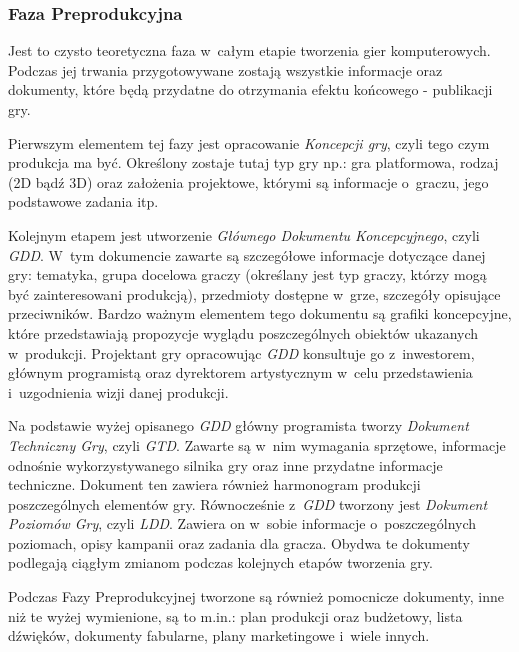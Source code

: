 \documentclass[12pt,a4paper,oneside]{book}
\theoremstyle{definition}
\numberwithin{equation}{chapter}
\begin{document}
\subsubsection{Faza Preprodukcyjna}
\par Jest to czysto teoretyczna faza w~całym etapie tworzenia gier komputerowych. Podczas jej trwania przygotowywane zostają wszystkie informacje oraz dokumenty, które będą przydatne do otrzymania efektu końcowego - publikacji gry.

\par Pierwszym elementem tej fazy jest opracowanie \textit{Koncepcji gry}, czyli tego czym produkcja ma być. Określony zostaje tutaj typ gry np.: gra platformowa, rodzaj (2D bądź 3D) oraz założenia projektowe, którymi są informacje o~graczu, jego podstawowe zadania itp.

\par Kolejnym etapem jest utworzenie \textit{Głównego Dokumentu Koncepcyjnego}, czyli \textit{GDD}. W~tym dokumencie zawarte są szczegółowe informacje dotyczące danej gry: tematyka, grupa docelowa graczy (określany jest typ graczy, którzy mogą być zainteresowani produkcją), przedmioty dostępne w~grze, szczegóły opisujące przeciwników. Bardzo ważnym elementem tego dokumentu są grafiki koncepcyjne, które przedstawiają propozycje wyglądu poszczególnych obiektów ukazanych w~produkcji. Projektant gry opracowując \textit{GDD} konsultuje go z~inwestorem, głównym programistą oraz dyrektorem artystycznym w~celu przedstawienia i~uzgodnienia wizji danej produkcji.
\par Na podstawie wyżej opisanego \textit{GDD} główny programista tworzy \textit{Dokument Techniczny Gry}, czyli \textit{GTD}. Zawarte są w~nim wymagania sprzętowe, informacje odnośnie wykorzystywanego silnika gry oraz inne przydatne informacje techniczne. Dokument ten zawiera również harmonogram produkcji poszczególnych elementów gry. Równocześnie z~\textit{GDD} tworzony jest \textit{Dokument Poziomów Gry}, czyli \textit{LDD}. Zawiera on w~sobie informacje o~poszczególnych poziomach, opisy kampanii oraz zadania dla gracza. Obydwa te dokumenty podlegają ciągłym zmianom podczas kolejnych etapów tworzenia gry.
\par Podczas Fazy Preprodukcyjnej tworzone są również pomocnicze dokumenty, inne niż te wyżej wymienione, są to m.in.: plan produkcji oraz budżetowy, lista dźwięków, dokumenty fabularne, plany marketingowe i~wiele innych.
\end{document}
